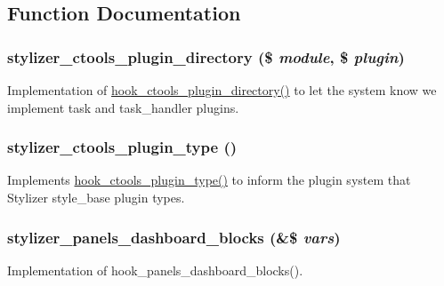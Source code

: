 \subsection{Function Documentation}
\hypertarget{stylizer_8module_a306f4b0aa81215b0b630cd338f611472}{
\subsubsection[{stylizer\_\-ctools\_\-plugin\_\-directory}]{\setlength{\rightskip}{0pt plus 5cm}stylizer\_\-ctools\_\-plugin\_\-directory (\$ {\em module}, \/  \$ {\em plugin})}}
\label{stylizer_8module_a306f4b0aa81215b0b630cd338f611472}
Implementation of \hyperlink{group__hooks_gaf17a0de7a7ca6e6c30c766ea1e44715e}{hook\_\-ctools\_\-plugin\_\-directory()} to let the system know we implement task and task\_\-handler plugins. \hypertarget{stylizer_8module_abeb96d42828cd289c995735a44425f89}{
\subsubsection[{stylizer\_\-ctools\_\-plugin\_\-type}]{\setlength{\rightskip}{0pt plus 5cm}stylizer\_\-ctools\_\-plugin\_\-type ()}}
\label{stylizer_8module_abeb96d42828cd289c995735a44425f89}
Implements \hyperlink{group__hooks_gacb27d27849a3374ddda0120603d549ac}{hook\_\-ctools\_\-plugin\_\-type()} to inform the plugin system that Stylizer style\_\-base plugin types. \hypertarget{stylizer_8module_a21439f0e6d0635c0825dd11f815f4a30}{
\subsubsection[{stylizer\_\-panels\_\-dashboard\_\-blocks}]{\setlength{\rightskip}{0pt plus 5cm}stylizer\_\-panels\_\-dashboard\_\-blocks (\&\$ {\em vars})}}
\label{stylizer_8module_a21439f0e6d0635c0825dd11f815f4a30}
Implementation of hook\_\-panels\_\-dashboard\_\-blocks().

